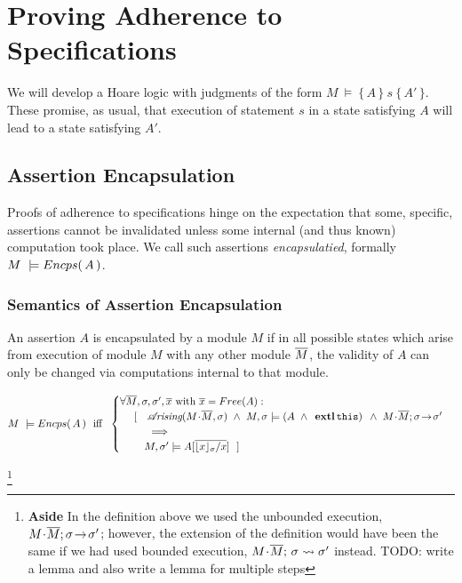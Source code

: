\newcommand{\extract}[1]{\ensuremath{{\mathcal I}\!nvs(#1)}}



\section{Proving Adherence to \SpecLang Specifications}


We will develop a  Hoare logic with judgments of the form  $M\ \models\  \{\, A \,  \}\ s\  \{\, A' \, \}$. These promise, as usual, that execution of statement $s$ in a state satisfying $A$ will lead to a state satisfying $A'$. 





\subsection {Assertion Encapsulation}
\label{s:encaps-proof}

{
Proofs of adherence to {\SpecLang specifications  hinge on the expectation that some, 
specific, assertions cannot be invalidated unless some 
} internal (and thus known) computation took place. 
{We call such assertions   \emph{encapsulatied},}
}
formally $M\ \models  {\ensuremath Encps(\, A\, )}$.
 

\subsubsection{Semantics of Assertion Encapsulation}

{An assertion $A$  is  encapsulated by a module $M$  if in all possible states which arise from execution of module $M$ with any other  module $\overline{M}$, the validity of $A$}  {can only be changed via computations internal to that module}.
 

\begin{definition} $~$ \\
\label{def:encapsulation}
$ %
    M\ \models \encaps{A}\ \   \mbox{iff}  \ \   
    \begin{cases}
     \forall \Mtwo, \sigma, \sigma', \overline{x} \mbox{ with } \overline{x}=Free(A):\\
   \ \ \ \  [\ \ \  \arising{M\madd\Mtwo}{\sigma}\ \wedge \  \satisfiesA{M}{\sigma}{(A \ \wedge\ \external {\prg{this})}}\  \wedge\  \leadstoOrig  {M\madd\Mtwo}  {\sigma}{\sigma'}\\
    \ \ \ \ \ \   \ \ \ \Longrightarrow\\
    \ \ \ \ \ \  \  {M},{\sigma'}\models{A[{\overline {{\interpret \sigma x}/x}}]} \ \  ]
    \end{cases}
 $%
  \end{definition}
 \footnote{\textbf{Aside} In the definition above we used the unbounded execution,  $M\!\cdot\!\overline{M};\sigma\! \rightarrow\! {\sigma'}$;  however, the extension of the definition would have been the same if we had used bounded execution, $M\!\cdot\!\overline{M};\, {\sigma} \rightsquigarrow \sigma'$ instead. TODO: write a lemma and also write a lemma for multiple steps}
 
